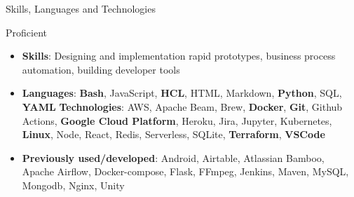 \documentclass[]{mcdowellcv}
\begin{document}
    \begin{cvsection}{Skills, Languages and Technologies}
        \begin{cvsubsection}{Proficient}{}{}
            \begin{itemize}
                    \item  \textbf{Skills}: Designing and implementation rapid prototypes, business process automation, building developer tools
                    \item  \textbf{Languages}: \textbf{Bash}, JavaScript, \textbf{HCL}, HTML, Markdown, \textbf{Python}, SQL, \textbf{YAML} \newline
                    \textbf{Technologies}: AWS, Apache Beam, Brew, \textbf{Docker}, \textbf{Git}, Github Actions, \textbf{Google Cloud Platform}, Heroku, Jira, Jupyter, Kubernetes, \textbf{Linux}, Node, React, Redis, Serverless, SQLite, \textbf{Terraform}, \textbf{VSCode}
                    \item \textbf{Previously used/developed}:  Android, Airtable, Atlassian Bamboo, Apache Airflow, Docker-compose, \newline Flask, FFmpeg, Jenkins, Maven, MySQL, Mongodb, Nginx, Unity
            \end{itemize}
        \end{cvsubsection}
    \end{cvsection}
\end{document}
